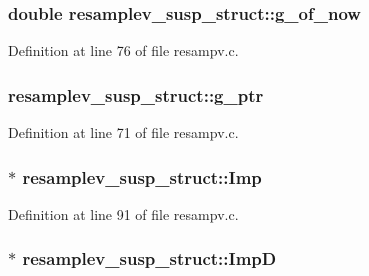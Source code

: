 \subsubsection[{\texorpdfstring{g\+\_\+of\+\_\+now}{g_of_now}}]{\setlength{\rightskip}{0pt plus 5cm}double resamplev\+\_\+susp\+\_\+struct\+::g\+\_\+of\+\_\+now}\hypertarget{structresamplev__susp__struct_a647d3c5bb2b1d81b40dd5935e523f5c4}{}\label{structresamplev__susp__struct_a647d3c5bb2b1d81b40dd5935e523f5c4}


Definition at line 76 of file resampv.\+c.

\subsubsection[{\texorpdfstring{g\+\_\+ptr}{g_ptr}}]{ resamplev\+\_\+susp\+\_\+struct\+::g\+\_\+ptr}\hypertarget{structresamplev__susp__struct_aa6aae99596bd0840c66ba894a9bb5a03}{}\label{structresamplev__susp__struct_aa6aae99596bd0840c66ba894a9bb5a03}


Definition at line 71 of file resampv.\+c.

\subsubsection[{\texorpdfstring{Imp}{Imp}}]{$\ast$ resamplev\+\_\+susp\+\_\+struct\+::\+Imp}\hypertarget{structresamplev__susp__struct_acd762383745dccb4768ccc071e4ce111}{}\label{structresamplev__susp__struct_acd762383745dccb4768ccc071e4ce111}


Definition at line 91 of file resampv.\+c.

\subsubsection[{\texorpdfstring{ImpD}{ImpD}}]{$\ast$ resamplev\+\_\+susp\+\_\+struct\+::\+ImpD}\hypertarget{structresamplev__susp__struct_a573b2e8010885b1dcb52e8a7472f11eb}{}\label{structresamplev__susp__struct_a573b2e8010885b1dcb52e8a7472f11eb}



